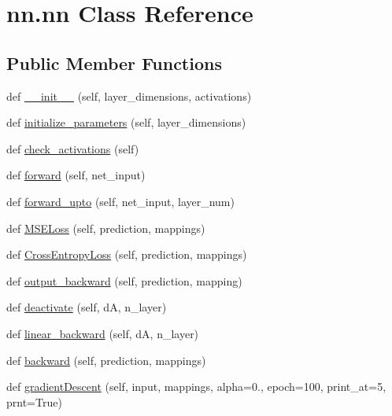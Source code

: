 \hypertarget{classnn_1_1nn}{}\section{nn.\+nn Class Reference}
\label{classnn_1_1nn}
\subsection*{Public Member Functions}
\begin{DoxyCompactItemize}
\item 
def \hyperlink{classnn_1_1nn_ad7304c7932970a07bf2869e97b79e0b5}{\+\_\+\+\_\+init\+\_\+\+\_\+} (self, layer\+\_\+dimensions, activations)
\item 
def \hyperlink{classnn_1_1nn_a9821fed1369b4d709fe297fe9e07d97b}{initialize\+\_\+parameters} (self, layer\+\_\+dimensions)
\item 
def \hyperlink{classnn_1_1nn_a15ee3f3e18ebae83c904b3441ece897d}{check\+\_\+activations} (self)
\item 
def \hyperlink{classnn_1_1nn_ae07002745b03901814d92ac66fe87781}{forward} (self, net\+\_\+input)
\item 
def \hyperlink{classnn_1_1nn_ac3d2b61ed992dc615eacda8e75a61a2b}{forward\+\_\+upto} (self, net\+\_\+input, layer\+\_\+num)
\item 
def \hyperlink{classnn_1_1nn_ae74a0f21e8722ea82a0f94135a81a348}{M\+S\+E\+Loss} (self, prediction, mappings)
\item 
def \hyperlink{classnn_1_1nn_a822299322a0b513f8985e61096be45bc}{Cross\+Entropy\+Loss} (self, prediction, mappings)
\item 
def \hyperlink{classnn_1_1nn_afa7d1462872fae95fe71f27ed00bf7ae}{output\+\_\+backward} (self, prediction, mapping)
\item 
def \hyperlink{classnn_1_1nn_a475811849fd370a47eb0e3b7bc09b283}{deactivate} (self, dA, n\+\_\+layer)
\item 
def \hyperlink{classnn_1_1nn_a0863e90359fa30486c7161cd31c5b4e7}{linear\+\_\+backward} (self, dA, n\+\_\+layer)
\item 
def \hyperlink{classnn_1_1nn_a53a7beb698fe127ebb1f636fccbaa126}{backward} (self, prediction, mappings)
\item 
def \hyperlink{classnn_1_1nn_a9b8b6d7bc350ef775a61c8c6f82f5501}{gradient\+Descent} (self, input, mappings, alpha=0., epoch=100, print\+\_\+at=5, prnt=True)
\end{DoxyCompactItemize}
